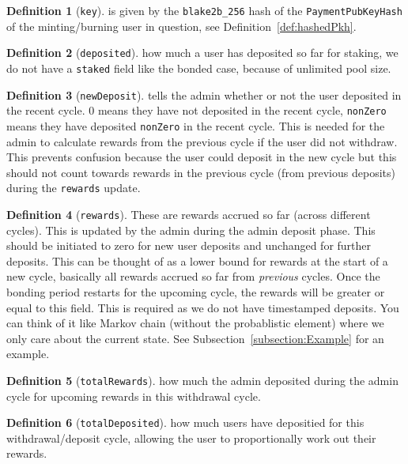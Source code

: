 \documentclass[10pt, a4paper]{article}
\theoremstyle{definition}
\newtheorem{definition}{Definition}[section]
\begin{document}
\begin{definition}[\texttt{key}]\label{def:key}
is given by the \texttt{blake2b\_256} hash of the \texttt{PaymentPubKeyHash} of the minting/burning user in question, see Definition~\ref{def:hashedPkh}. 
\end{definition}

\begin{definition}[\texttt{deposited}]\label{def:deposited} how much a user has deposited so far for staking, we do not have a \texttt{staked} field like the bonded case, because of unlimited pool size.
\end{definition}

\begin{definition}[\texttt{newDeposit}]\label{def:newDeposit} tells the admin whether or not the user deposited in the recent cycle. 0 means they have not deposited in the recent cycle, \texttt{nonZero} means they have deposited \texttt{nonZero} in the recent cycle. This is needed for the admin to calculate rewards from the previous cycle if the user did not withdraw. This prevents confusion because the user could deposit in the new cycle but this should not count towards rewards in the previous cycle (from previous deposits) during the \texttt{rewards} update.
\end{definition}

\begin{definition}[\texttt{rewards}]\label{def:rewards}
These are rewards accrued so far (across different cycles). This is updated by the admin during the admin deposit phase. This should be initiated to zero for new user deposits and unchanged for further deposits. This can be thought of as a lower bound for rewards at the start of a new cycle, basically all rewards accrued so far from \textit{previous} cycles. Once the bonding period restarts for the upcoming cycle, the rewards will be greater or equal to this field. This is required as we do not have timestamped deposits. You can think of it like Markov chain (without the probablistic element) where we only care about the current state. See Subsection~\ref{subsection:Example} for an example.
\end{definition}

\begin{definition}[\texttt{totalRewards}]\label{def:totalRewards} how much the admin deposited during the admin cycle for upcoming rewards in this withdrawal cycle.
\end{definition}

\begin{definition}[\texttt{totalDeposited}]\label{def:totalDeposited} how much users have depositied for this withdrawal/deposit cycle, allowing the user to proportionally work out their rewards.
\end{definition}
\end{document}
